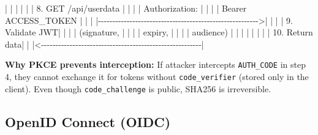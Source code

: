 \documentclass[11pt]{article}
\newenvironment{Shaded}{\begin{snugshade}}{\end{snugshade}}
\newcommand{\FloatTok}[1]{\textcolor[rgb]{0.96,0.45,0.00}{#1}}
\newcommand{\NormalTok}[1]{\textcolor[rgb]{0.81,0.81,0.76}{#1}}
\newcommand{\OperatorTok}[1]{\textcolor[rgb]{0.81,0.81,0.76}{#1}}
\begin{document}
\begin{Shaded}
\begin{Highlighting}[]
  \OperatorTok{|}                \OperatorTok{|}                        \OperatorTok{|}                          \OperatorTok{|}
  \OperatorTok{|}                \OperatorTok{|} \FloatTok{8.}\NormalTok{ GET }\OperatorTok{/}\NormalTok{api}\OperatorTok{/}\NormalTok{userdata   }\OperatorTok{|}                          \OperatorTok{|}
  \OperatorTok{|}                \OperatorTok{|}\NormalTok{    Authorization:      }\OperatorTok{|}                          \OperatorTok{|}
  \OperatorTok{|}                \OperatorTok{|}\NormalTok{    Bearer ACCESS\_TOKEN }\OperatorTok{|}                          \OperatorTok{|}
  \OperatorTok{|}                \OperatorTok{|{-}{-}{-}{-}{-}{-}{-}{-}{-}{-}{-}{-}{-}{-}{-}{-}{-}{-}{-}{-}{-}{-}{-}{-}{-}{-}{-}{-}{-}{-}{-}{-}{-}{-}{-}{-}{-}{-}{-}{-}{-}{-}{-}{-}{-}{-}{-}{-}{-}{-}{-}{-}{-}{-}{-}{-}\textgreater{}|}
  \OperatorTok{|}                \OperatorTok{|}                        \OperatorTok{|}           \FloatTok{9.}\NormalTok{ Validate JWT}\OperatorTok{|}
  \OperatorTok{|}                \OperatorTok{|}                        \OperatorTok{|}\NormalTok{              (signature, }\OperatorTok{|}
  \OperatorTok{|}                \OperatorTok{|}                        \OperatorTok{|}\NormalTok{              expiry,     }\OperatorTok{|}
  \OperatorTok{|}                \OperatorTok{|}                        \OperatorTok{|}\NormalTok{              audience)   }\OperatorTok{|}
  \OperatorTok{|}                \OperatorTok{|}                        \OperatorTok{|}                          \OperatorTok{|}
  \OperatorTok{|}                \OperatorTok{|}                        \OperatorTok{|}           \FloatTok{10.}\NormalTok{ Return data}\OperatorTok{|}
  \OperatorTok{|}                \OperatorTok{|\textless{}{-}{-}{-}{-}{-}{-}{-}{-}{-}{-}{-}{-}{-}{-}{-}{-}{-}{-}{-}{-}{-}{-}{-}{-}{-}{-}{-}{-}{-}{-}{-}{-}{-}{-}{-}{-}{-}{-}{-}{-}{-}{-}{-}{-}{-}{-}{-}{-}{-}{-}{-}{-}{-}{-}{-}{-}|}
\end{Highlighting}
\end{Shaded}

\textbf{Why PKCE prevents interception:} If attacker intercepts \texttt{AUTH\_CODE} in step 4, they cannot exchange it for tokens without \texttt{code\_verifier} (stored only in the client). Even though \texttt{code\_challenge} is public, SHA256 is irreversible.

\subsection{OpenID Connect (OIDC)}\label{openid-connect-oidc}
\end{document}
